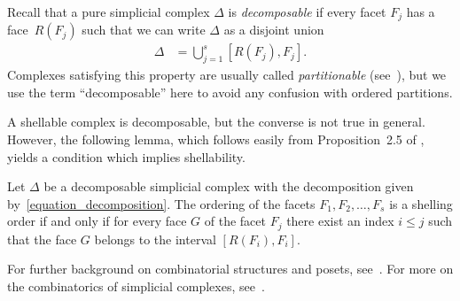 Recall that a pure simplicial complex $\Delta$ 
is \emph{decomposable} if 
every facet $F_{j}$ has a face~$R(F_{j})$ such that
we can write $\Delta$ as
a disjoint union
\begin{align}
\Delta & = \bigcup_{j=1}^{s} [R(F_{j}), F_{j}] .
\label{equation_decomposition}
\end{align}
Complexes satisfying this property are usually called
\emph{partitionable} (see~\cite{Stanley_green}), but we use the term ``decomposable''
here to avoid any confusion with ordered partitions.

A shellable complex is decomposable,
but the converse is not true in general.
However, the following lemma, which follows
easily from Proposition~2.5 of
\cite{Bjorner_Wachs},
yields a condition
which implies shellability.



\begin{lemma}
Let $\Delta$ be a decomposable simplicial complex
with the decomposition
given by~\eqref{equation_decomposition}.
The ordering of the facets
$F_{1}, F_{2}, \ldots, F_{s}$ is a shelling order
if and only if for every face $G$ of the facet $F_{j}$
there exist an index $i \leq j$
such that the face $G$ belongs to
the interval $[R(F_{i}), F_{i}]$.
\label{lemma_shelling_condition}
\end{lemma}


For further background on combinatorial structures and posets,
see~\cite{Stanley_EC_1}.
For more on the combinatorics of simplicial complexes,
see~\cite{Stanley_green}.




